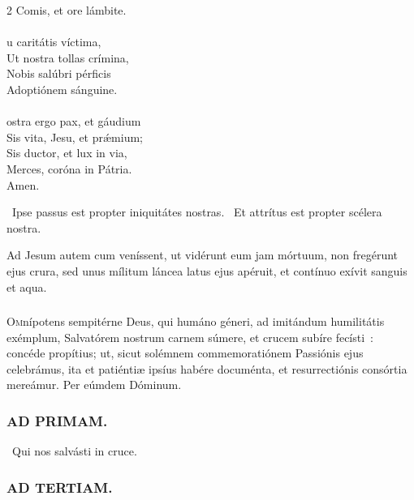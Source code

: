 \documentclass[9pt,twoside]{extarticle}
\begin{document}
\begin{multicols}{2}
Comis, et ore lámbite.\\
\\
u caritátis víctima,\\
Ut nostra tollas crímina,\\
Nobis salúbri pérficis\\
Adoptiónem sánguine.\\
\\
ostra ergo pax, et gáudium\\
Sis vita, Jesu, et prǽmium;\\
Sis ductor, et lux in via,\\
Merces, coróna in Pátria.\\
Amen.

\begin{tightlist}{}
\item {}~Ipse passus est propter iniquitátes nostras. ~Et attrítus est propter scélera nostra.
\item {} Ad Jesum autem cum veníssent, ut vidérunt eum jam mórtuum, non fregérunt ejus crura, sed unus mílitum láncea latus ejus apéruit, et contínuo exívit sanguis et aqua.
\end{tightlist}
\subsubsection*{\center{}}
\lettrine{O}mnípotens sempitérne Deus, qui humáno géneri, ad imitándum humilitátis exémplum, Salvatórem nostrum carnem súmere, et crucem subíre fecísti~: concéde propítius; ut, sicut solémnem commemoratiónem Passiónis ejus celebrámus, ita et patiéntiæ ipsíus habére documénta, et resurrectiónis consórtia mereámur. Per eúmdem Dóminum.

\begin{tightlist}{}
\item {}
\end{tightlist}

\subsubsection*{\center \textsc{AD PRIMAM.}}
\begin{tightlist}{}
\item {}~Qui nos salvásti in cruce.
\end{tightlist}

\subsubsection*{\center \textsc{AD TERTIAM.}}

\end{multicols}
\end{document}
